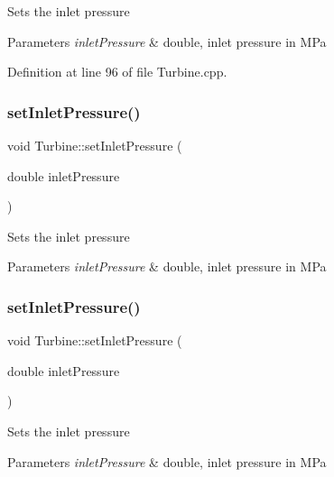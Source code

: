 Sets the inlet pressure


\begin{DoxyParams}{Parameters}
{\em inlet\+Pressure} & double, inlet pressure in M\+Pa \\
\hline
\end{DoxyParams}


Definition at line 96 of file Turbine.\+cpp.

\mbox{\label{class_turbine_a04996baab9a40d449a69c737c00be8e4}} 
\subsubsection{\texorpdfstring{set\+Inlet\+Pressure()}{setInletPressure()}\hspace{0.1cm}{\footnotesize\ttfamily [2/3]}}
{\footnotesize\ttfamily void Turbine\+::set\+Inlet\+Pressure (\begin{DoxyParamCaption}\item[{double}]{inlet\+Pressure }\end{DoxyParamCaption})}

Sets the inlet pressure


\begin{DoxyParams}{Parameters}
{\em inlet\+Pressure} & double, inlet pressure in M\+Pa \\
\hline
\end{DoxyParams}
\mbox{\label{class_turbine_a04996baab9a40d449a69c737c00be8e4}} 
\subsubsection{\texorpdfstring{set\+Inlet\+Pressure()}{setInletPressure()}\hspace{0.1cm}{\footnotesize\ttfamily [3/3]}}
{\footnotesize\ttfamily void Turbine\+::set\+Inlet\+Pressure (\begin{DoxyParamCaption}\item[{double}]{inlet\+Pressure }\end{DoxyParamCaption})}

Sets the inlet pressure


\begin{DoxyParams}{Parameters}
{\em inlet\+Pressure} & double, inlet pressure in M\+Pa \\
\hline
\end{DoxyParams}
\mbox{\label{class_turbine_aecc05c70870fb11bbc0bb4fe5d8438bd}} 
